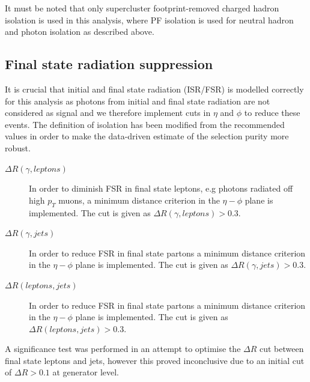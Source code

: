 It must be noted that only supercluster footprint-removed charged hadron isolation is used in this analysis, where PF isolation is used for neutral hadron and photon isolation as described above. 

\subsection{Final state radiation suppression}

It is crucial that initial and final state radiation (ISR/FSR) is modelled correctly for this analysis as photons from initial and final state radiation are not considered as signal and we therefore implement cuts in $\eta$ and $\phi$ to reduce these events. The definition of isolation has been modified from the recommended values in order to make the data-driven estimate of the selection purity more robust.

\begin{description}
\item[$\Delta R(\gamma, leptons)$] In order to diminish FSR in final state leptons, e.g photons radiated off high $p_T$ muons, a minimum distance criterion in the $\eta - \phi$ plane is implemented. The cut is given as $\Delta R(\gamma, leptons) > 0.3$.

\item[$\Delta R(\gamma, jets)$] In order to reduce FSR in final state partons a minimum distance criterion in the $\eta - \phi$ plane is implemented. The cut is given as $\Delta R(\gamma, jets) > 0.3$.

\item[$\Delta R(leptons, jets)$] In order to reduce FSR in final state partons a minimum distance criterion in the $\eta - \phi$ plane is implemented. The cut is given as $\Delta R(leptons, jets) > 0.3$.
\end{description}

A significance test was performed in an attempt to optimise the $\Delta R$ cut between final state leptons and jets, however this proved inconclusive due to an initial cut of $\Delta R > 0.1$ at generator level.

